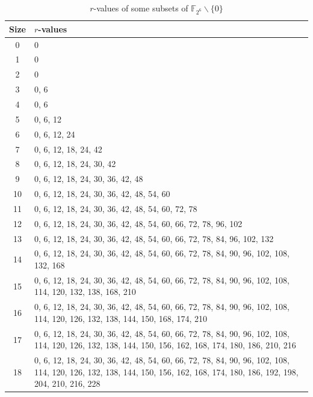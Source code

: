 \documentclass[12pt,a4paper]{article}
\begin{document}
					\newpage
	\begin{table}[h]\label{table2-6}	
		\caption{$r$-values of some subsets of $\mathbb{F}_{2^6}\backslash\{0\}$}				
		\begin{center}
			{\scriptsize \begin{tabular}{|c|p{15cm}|}
					\hline
					\textbf{Size} & \textbf{$r$-values} \\ \hline
					0  & 0 \\ \hline
					1  & 0 \\ \hline
					2  & 0 \\ \hline
					3  & 0, 6 \\ \hline
					4  & 0, 6 \\ \hline
					5  & 0, 6, 12 \\ \hline
					6  & 0, 6, 12, 24 \\ \hline
					7  & 0, 6, 12, 18, 24, 42 \\ \hline
					8  & 0, 6, 12, 18, 24, 30, 42 \\ \hline
					9  & 0, 6, 12, 18, 24, 30, 36, 42, 48 \\ \hline
					10 & 0, 6, 12, 18, 24, 30, 36, 42, 48, 54, 60 \\ \hline
					11 & 0, 6, 12, 18, 24, 30, 36, 42, 48, 54, 60, 72, 78 \\ \hline
					12 & 0, 6, 12, 18, 24, 30, 36, 42, 48, 54, 60, 66, 72, 78, 96, 102 \\ \hline
					13 & 0, 6, 12, 18, 24, 30, 36, 42, 48, 54, 60, 66, 72, 78, 84, 96, 102, 132 \\ \hline
					14 & 0, 6, 12, 18, 24, 30, 36, 42, 48, 54, 60, 66, 72, 78, 84, 90, 96, 102, 108, 132, 168 \\ \hline
					15 & 0, 6, 12, 18, 24, 30, 36, 42, 48, 54, 60, 66, 72, 78, 84, 90, 96, 102, 108, 114, 120, 132, 138, 168, 210 \\ \hline
					16 & 0, 6, 12, 18, 24, 30, 36, 42, 48, 54, 60, 66, 72, 78, 84, 90, 96, 102, 108, 114, 120, 126, 132, 138, 144, 150, 168, 174, 210 \\ \hline
					17 & 0, 6, 12, 18, 24, 30, 36, 42, 48, 54, 60, 66, 72, 78, 84, 90, 96, 102, 108, 114, 120, 126, 132, 138, 144, 150, 156, 162, 168, 174, 180, 186, 210, 216 \\ \hline
					18 & 0, 6, 12, 18, 24, 30, 36, 42, 48, 54, 60, 66, 72, 78, 84, 90, 96, 102, 108, 114, 120, 126, 132, 138, 144, 150, 156, 162, 168, 174, 180, 186, 192, 198, 204, 210, 216, 228 \\ \hline

\end{tabular}}
\end{center}
\end{table}
\end{document}
